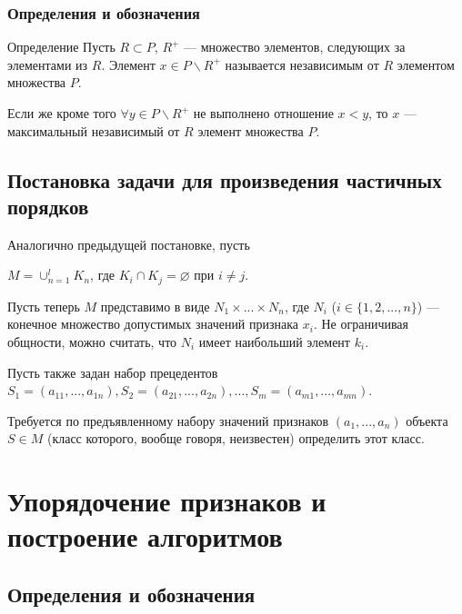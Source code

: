 \documentclass[
	11pt,
]{beamer}
\begin{document}
\begin{frame}
	\frametitle{Определения и обозначения}
	
	\begin{block}{Определение}
		Пусть $R \subset P$, $R^+$ — множество элементов, следующих за элементами из $R$. Элемент $x \in P \backslash R^+$ называется независимым от $R$ элементом множества $P$.

		\bigskip

		Если же кроме того $\forall y \in P \backslash R^+$ не выполнено отношение $x < y$, то $x$ — максимальный независимый от $R$ элемент множества $P$.
	\end{block}

\end{frame}

\subsection{Постановка задачи для произведения частичных порядков}

\begin{frame}
	
	Аналогично предыдущей постановке, пусть
	
	$M = \cup_{n=1}^{l}K_n$, где $K_i \cap K_j = \varnothing$ при $i \neq j$.

	\bigskip

	Пусть теперь $M$ представимо в виде $N_1 \times ... \times N_n$, где $N_i$ ($i \in \{1, 2, ..., n\}$) — конечное множество допустимых значений признака $x_i$. Не ограничивая общности, можно считать, что $N_i$ имеет наибольший элемент $k_i$.

	\bigskip

	Пусть также задан набор прецедентов $S_1 = (a_{11}, ..., a_{1n}), S_2 = (a_{21}, ..., a_{2n}), ..., S_m = (a_{m1}, ..., a_{mn})$.

	\bigskip

	Требуется по предъявленному набору значений признаков $(a_1, ..., a_n)$ объекта $S \in M$ (класс которого, вообще говоря, неизвестен) определить этот класс.
	
\end{frame}

\section{Упорядочение признаков и построение алгоритмов}

\subsection{Определения и обозначения}
\end{document}
